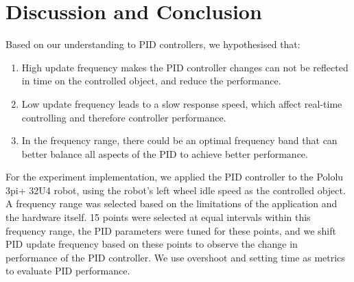 \documentclass[conference]{IEEEtran}
\begin{document}
\section{Discussion and Conclusion}
\label{V_Discussion and Conclusion}
Based on our understanding to PID controllers, we hypothesised that:
\begin{enumerate}
    \item High update frequency makes the PID controller changes can not be reflected in time on the controlled object, and reduce the performance.
    \item Low update frequency leads to a slow response speed, which affect real-time controlling and therefore controller performance.
    \item In the frequency range, there could be an optimal frequency band that can better balance all aspects of the PID to achieve better performance.
\end{enumerate}

For the experiment implementation, we applied the PID controller to the Pololu 3pi+ 32U4 robot, using the robot's left wheel idle speed as the controlled object. A frequency range was selected based on the limitations of the application and the hardware itself. 15 points were selected at equal intervals within this frequency range, the PID parameters were tuned for these points, and we shift PID update frequency based on these points to observe the change in performance of the PID controller. We use overshoot and setting time as metrics to evaluate PID performance.

\end{document}
